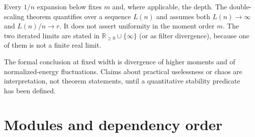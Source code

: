 \begin{remark}
Every $1/n$ expansion below fixes $m$ and, where applicable, the depth.  The double-scaling theorem
quantifies over a sequence $L(n)$ and assumes both $L(n)\to\infty$ and
$L(n)/n\to r$.  It does not assert uniformity in the moment order $m$.  The two iterated limits are
stated in $\mathbb R_{\geq0}\cup\{\infty\}$ (or as filter divergence), because one of them is not a
finite real limit.
\end{remark}

\begin{remark}
The formal conclusion at fixed width is divergence of higher moments and of normalized-energy
fluctuations.  Claims about practical uselessness or chaos are interpretation, not theorem
statements, until a quantitative stability predicate has been defined.
\end{remark}

\section{Modules and dependency order}

